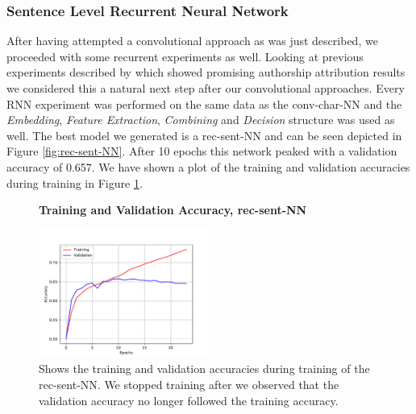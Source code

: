 \subsubsection{Sentence Level Recurrent Neural Network}
\label{subsubsec:rec_sent_nn}

After having attempted a convolutional approach as was just described, we
proceeded with some recurrent experiments as well. Looking at previous
experiments described by \cite{qian:2018} which showed promising authorship
attribution results we considered this a natural next step after our
convolutional approaches. Every \gls{RNN} experiment was performed on the same
data as the \gls{conv-char-NN} and the \textit{Embedding}, \textit{Feature
Extraction}, \textit{Combining} and \textit{Decision} structure was used as
well. The best model we generated is a \gls{rec-sent-NN} and can be seen
depicted in Figure \ref{fig:rec-sent-NN}. After 10 epochs this network peaked
with a validation accuracy of 0.657. We have shown a plot of the training and
validation accuracies during training in Figure \ref{fig:rec-sent-NN-training}.

\begin{figure}
    \centering
    \textbf{Training and Validation Accuracy, \gls{rec-sent-NN}}\par\medskip
    \includegraphics[width=0.5\textwidth]{./pictures/experiments/rec_sent_nn/training}
    \caption{Shows the training and validation accuracies during training of the
    \gls{rec-sent-NN}. We stopped training after we observed that the validation
    accuracy no longer followed the training accuracy.}
    \label{fig:rec-sent-NN-training}
\end{figure}

